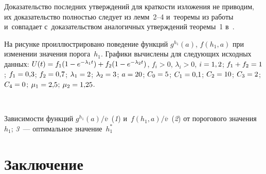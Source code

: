 \begin{multicols}{2}
  Доказательство последних утверждений для краткости изложения не 
приводим, их доказательство полностью следует из лемм~2--4 и~теоремы из 
работы~\cite{10-aga} и~совпадает с~доказательством аналогичных утверждений 
теоремы~1 в~\cite{6-aga}. 
  
  На рисунке проиллюстрировано поведение функций $g^{h_1}(a)$, $f(h_1,a)$ 
при изменении значения порога~$h_1$.
Графики вычислены для следующих исходных 
данных: $U(t)\hm= f_1(1\hm- e^{-\lambda_1t})\hm+ f_2(1-e^{-\lambda_2t})$, $f_i > 
0$, $\lambda_i>0$, $i\hm= 1,2$; $f_1\hm+f_2\hm=1$; $f_1\hm= 0{,}3$; $f_2\hm= 
0{,}7$; $\lambda_1\hm= 2$; $\lambda_2\hm= 3$; $a\hm=20$; $C_0\hm=5$; 
$C_1\hm= 0{,}1$; $C_2\hm= 10$; $C_3\hm= 2$; $C_4\hm= 0$; $\mu_1\hm= 
2{,}5$; $\mu_2\hm= 1{,}25$. 
  
 { \begin{center}  %
 \vspace*{-5pt}
     \mbox{%
\epsfxsize=79mm
}

\end{center}



\noindent
{\small Зависимости функций $g^{h_1}(a)/\overline{v}$~(\textit{1}) 
и~$f(h_1,a)/\overline{v}$~(\textit{2}) от порогового значения~$h_1$;
\textit{3}~--- оптимальное значение~$h_1^*$
}}

  
 
  
\section{Заключение}


\end{multicols}
